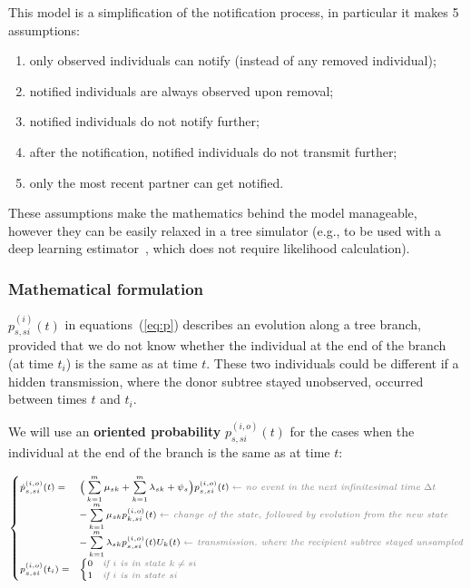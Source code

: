 \documentclass[a4paper,10pt]{article}
\begin{document}
This model is a simplification of the notification process, in particular it makes 5 assumptions:
\begin{enumerate}
\item only observed individuals can notify (instead of any removed individual);
\item notified individuals are always observed upon removal;
\item notified individuals do not notify further;
\item after the notification, notified individuals do not transmit further;
\item only the most recent partner can get notified.
\end{enumerate}

These assumptions make the mathematics behind the model manageable, however they can be easily relaxed in a tree simulator (e.g., to be used with a deep learning estimator~\cite{Voznica2021}, which does not require likelihood calculation).

\subsubsection{Mathematical formulation}
$p_{s,si}^{(i)}(t)$ in equations~(\ref{eq:p}) describes an evolution along a tree branch, provided that we do not know whether the individual at the end of the branch (at time $t_i$) is the same as at time $t$. These two individuals could be different if a hidden transmission, where the donor subtree stayed unobserved, occurred between times $t$ and $t_i$.

We will use an \textbf{oriented probability} $p^{(i,o)}_{s,si}(t)$ for the cases when the individual at the end of the branch is the same as at time $t$:

\begin{equation}
\scriptsize
\begin{cases}
\dot{p}_{s,si}^{(i,o)}(t) = & \Big(\sum\limits_{k=1}^{m} \mu_{sk} + \sum\limits_{k=1}^{m} \lambda_{sk} + \psi_s\Big) p_{s,si}^{(i,o)}(t)\; \textit{\color{gray} $\leftarrow$ no event in the next infinitesimal time $\Delta t$ }\\
    & - \sum\limits_{k=1}^{m} \mu_{sk} p_{k,si}^{(i,o)}(t)\;  \textit{\color{gray} $\leftarrow$ change of the state, followed by evolution from the new state }\\
    & - \sum\limits_{k=1}^{m} \lambda_{sk} p_{s,si}^{(i,o)}(t)U_{k}(t)\;  \textit{\color{gray} $\leftarrow$ transmission, where the recipient subtree stayed unsampled}\\
p_{s,si}^{(i,o)}(t_i) = & 
    \begin{cases}
    0 & \textit{\color{gray} if $i$ is in state $k \neq si$}\\
    1 & \textit{\color{gray} if $i$ is in state $si$}
    \end{cases}\label{eq:p-o}
\end{cases}
\end{equation}
\end{document}

